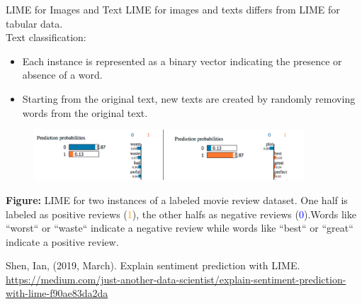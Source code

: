 \documentclass[11pt,compress,t,notes=noshow, xcolor=table]{beamer}
\begin{document}
\begin{vbframe}{LIME for Images and Text}
LIME for images and texts differs from LIME for tabular data. \\[0.2cm]
Text classification: 
\begin{itemize}
    \item Each instance is represented as a binary vector indicating the presence or absence of a word.
  \item Starting from the original text, new texts are created by randomly removing words from the original text. 
\end{itemize}

\begin{figure}
\begin{center}
 \includegraphics[width=0.9\textwidth]{figure/lime_movier}
\end{center}
\end{figure}


 \scriptsize{\textbf{Figure:} LIME for two instances of a labeled movie review dataset. One half is labeled as positive reviews (\textcolor{orange}{1}), 
the other halfs as negative reviews (\textcolor{blue}{0}).Words like ``worst`` or ``waste`` indicate a negative review while words like ``best`` or ``great`` indicate a positive review.}

\vspace{0.3cm}
{\tiny{Shen, Ian, (2019, March). Explain sentiment prediction with LIME.
\url{https://medium.com/just-another-data-scientist/explain-sentiment-prediction-with-lime-f90ae83da2da}}\par}

\framebreak


\end{vbframe}
\end{document}
